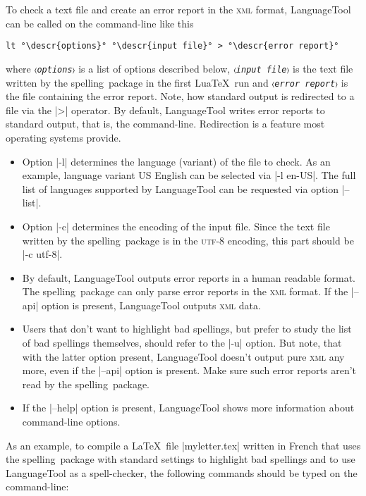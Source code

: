 \documentclass[11pt]{article}
\newcommand*{\pkg}{\textsf{spelling}}
\newcommand*{\acr}[1]{\mbox{\scshape#1}}
\newcommand*{\descr}[1]{〈\emph{#1}〉}
\begin{document}
To check a text file and create an error report in the \acr{xml} format,
LanguageTool can be called on the command-line like this
\begin{lstlisting}[escapeinside=°°]
lt °\descr{options}° °\descr{input file}° > °\descr{error report}°
\end{lstlisting}
where \texttt{\descr{options}} is a list of options described below,
\texttt{\descr{input file}} is the text file written by the \pkg\
package in the first Lua\TeX\ run and \texttt{\descr{error report}} is
the file containing the error report.  Note, how standard output is
redirected to a file via the |>| operator.  By default, LanguageTool
writes error reports to standard output, that is, the command-line.
Redirection is a feature most operating systems provide.

\begin{itemize}

\item Option |-l| determines the language (variant) of the file to
  check.  As an example, language variant US English can be selected via
  |-l en-US|.  The full list of languages supported by LanguageTool can
  be requested via option |--list|.

\item Option |-c| determines the encoding of the input file.  Since the
  text file written by the \pkg\ package is in the \acr{utf-8} encoding,
  this part should be |-c utf-8|.

\item By default, LanguageTool outputs error reports in a human readable
  format.  The \pkg\ package can only parse error reports in the
  \acr{xml} format.  If the |--api| option is present, LanguageTool
  outputs \acr{xml} data.

\item Users that don't want to highlight bad spellings, but prefer to
  study the list of bad spellings themselves, should refer to the |-u|
  option.  But note, that with the latter option present, LanguageTool
  doesn't output pure \acr{xml} any more, even if the |--api| option is
  present.  Make sure such error reports aren't read by the \pkg\
  package.

\item If the |--help| option is present, LanguageTool shows more
  information about command-line options.

\end{itemize}

As an example, to compile a \LaTeX\ file |myletter.tex| written in
French that uses the \pkg\ package with standard settings to highlight
bad spellings and to use LanguageTool as a spell-checker, the following
commands should be typed on the command-line:
\end{document}
